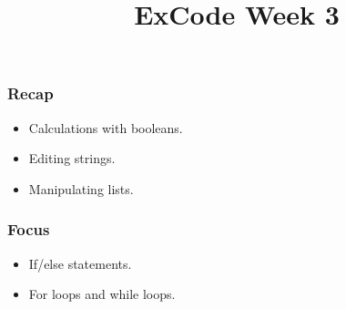 \documentclass{beamer}
\title{ExCode Week 3}
\institute{University of Exeter}
\date{\displaydate{today}}
\begin{document}
\frame{\titlepage}

\begin{frame}
	\frametitle{Recap}

	\begin{itemize}
		\item{Calculations with booleans.}
		\item{Editing strings.}
		\item{Manipulating lists.}
	\end{itemize}
\end{frame}

\begin{frame}
	\frametitle{Focus}

	\begin{itemize}
		\item{If/else statements.}
		\item{For loops and while loops.}
	\end{itemize}
\end{frame}
\end{document}
